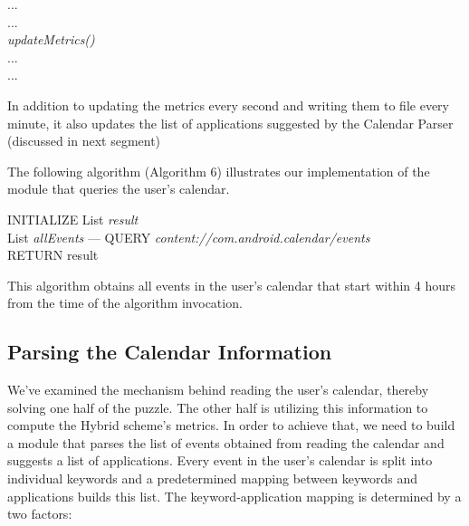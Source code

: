\documentclass[12pt]{uthesis-v12}  %
\begin{document}
			\begin{algorithm}[H]
				\SetAlgoLined
				
				{	
					...\\
					...\\
					{\em updateMetrics()}\\
					...\\
					...\\	
				}
				
				\caption[Update Suggested Applications List]{In addition to updating the metrics every second and writing them to file every minute, it also updates the list of applications suggested by the Calendar Parser (discussed in next segment)}
			\end{algorithm}
			
			The following algorithm (Algorithm 6) illustrates our implementation of the module that queries the user's calendar.
			
			\begin{algorithm}[H]
				\SetAlgoLined
				INITIALIZE List {\em result}\\
				List {\em allEvents} ---  QUERY {\em content://com.android.calendar/events}\\
				{	
				}
				RETURN result
				\caption[Algorithm to read user's calendar]{This algorithm obtains all events in the user's calendar that start within 4 hours from the time of the algorithm invocation.}
			\end{algorithm}
						
		\subsection{Parsing the Calendar Information}
			We've examined the mechanism behind reading the user's calendar, thereby solving one half of the puzzle. The other half is utilizing this information to compute the Hybrid scheme's metrics. In order to achieve that, we need to build a module that parses the list of events obtained from reading the calendar and suggests a list of applications. Every event in the user's calendar is split into individual keywords and a predetermined mapping between keywords and applications builds this list. The keyword-application mapping is determined by a two factors:
			
\end{document}

